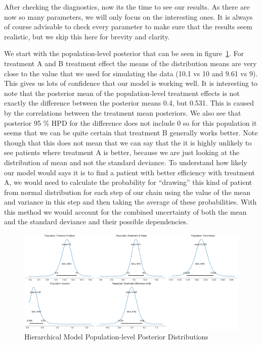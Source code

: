 \documentclass[12pt,a4paper,leqno]{report}
\theoremstyle{plain}
\theoremstyle{definition}
\theoremstyle{remark}
\begin{document}
After checking the diagnostics, now its the time to see our results. As there are
now so many parameters, we will only focus on the interesting ones. It is always of
course advisable to check every parameter to make sure that the results seem realistic,
but we skip this here for brevity and clarity.

We start with the population-level posterior that can be seen in figure\
\ref{hierarchicalmodelpopulationposteriors}. For treatment A and B treatment effect the means of the
distribution means are very close to the value that we used for simulating the data (10.1
vs 10 and 9.61 vs 9). This gives us lots of confidence that our
model is working well. It is interesting to note that the
posterior mean of the population-level treatment effects is not exactly the difference
between the posterior means 0.4, but 0.531. This is caused by the correlations between
the treatment mean posteriors. We also see that posterior 95 \% HPD for the difference does not include 0
so for this population it seems that we can be quite certain that treatment B
generally works better. Note though that this does not mean that we can say that the it is highly
unlikely to see patients where treatment A is better, because we are just looking at the
distribution of mean and not the standard deviance. To understand how likely our model
would says it is to find a patient with better efficiency with treatment A, we would need
to calculate the probability for ``drawing'' this kind of patient from normal
distribution for each step of our chain using the value of the mean and variance in this
step and then taking the average of these probabilities. With this method we would
account for the combined uncertainty of both the mean and
the standard deviance and their possible dependencies.

\bigskip
\begin{figure}[H]
    \caption{Hierarchical Model Population-level Posterior Distributions}\label{hierarchicalmodelpopulationposteriors}
    \bigskip
    \includegraphics[width=\textwidth,height=\textheight,keepaspectratio]{hierarchical_model_population_level_posteriors.pdf}
\end{figure}
\bigskip
\end{document}
